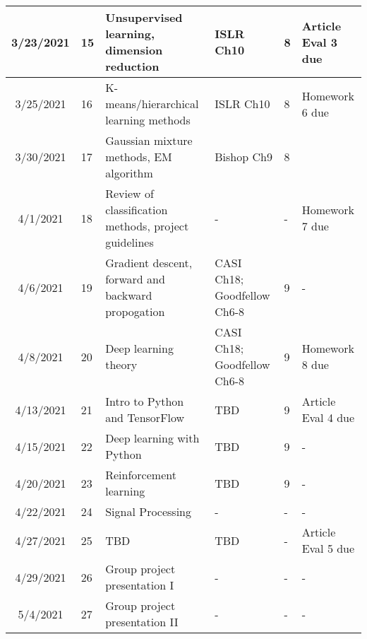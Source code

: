 \documentclass[11pt]{article}
\begin{document}
\begin{center}
\begin{tabular}{c|m{3em}|m{21em}|m{7em}|m{3em}|m{8em}}
3/23/2021 & 15 & Unsupervised learning, dimension reduction & ISLR Ch10 & 8 & Article Eval 3 due \\ \hline
3/25/2021 & 16 & K-means/hierarchical learning methods & ISLR Ch10 &  8 & Homework 6 due \\ \hline
3/30/2021 & 17 & Gaussian mixture methods, EM algorithm & Bishop Ch9 &  8 & \\ \hline
4/1/2021 & 18 & Review of classification methods, project guidelines & - & - & Homework 7 due \\ \hline
4/6/2021 & 19 & Gradient descent, forward and backward propogation & CASI Ch18; Goodfellow Ch6-8 &  9 & - \\ \hline
4/8/2021 & 20 & Deep learning theory & CASI Ch18; Goodfellow Ch6-8 & 9 & Homework 8 due\\ \hline
4/13/2021 & 21 & Intro to Python and TensorFlow & TBD & 9 &  Article Eval 4 due\\ \hline
4/15/2021 & 22 & Deep learning with Python & TBD & 9 & -\\ \hline
4/20/2021 & 23 & Reinforcement learning & TBD & 9 & -\\ \hline
4/22/2021 & 24 & Signal Processing & - & - & -\\ \hline
4/27/2021 & 25 & TBD & TBD & - & Article Eval 5 due\\ \hline
4/29/2021 & 26 & Group project presentation I & - & - & -\\ \hline
5/4/2021 & 27 & Group project presentation II & - & - & - 
\end{tabular}
\end{center}
\end{document}
